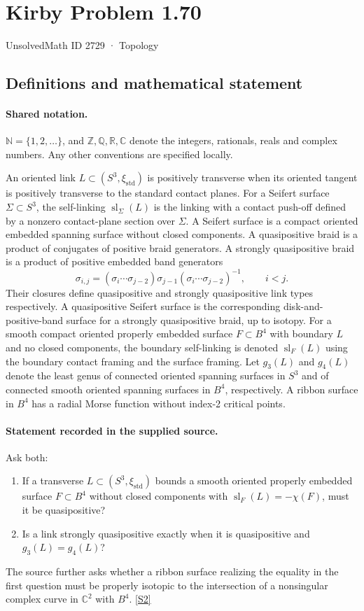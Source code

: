 \documentclass[11pt]{article}
\newcommand{\sref}[2]{\hyperlink{source:#1:#2}{[S#2]}}
\begin{document}
\setcounter{section}{2728}
\section{Kirby Problem 1.70}\label{2729}
{\small\sffamily UnsolvedMath ID 2729 · Topology}
\subsection{Definitions and mathematical statement}

\paragraph{Shared notation.}$\mathbb N=\{1,2,\ldots\}$, and $\mathbb Z,\mathbb Q,\mathbb R,\mathbb C$ denote the integers, rationals, reals and complex numbers. Any other conventions are specified locally.


An oriented link $L\subset(S^3,\xi_{\mathrm{std}})$ is positively transverse when its oriented tangent is positively transverse to the standard contact planes. For a Seifert surface $\Sigma\subset S^3$, the self-linking $\operatorname{sl}_\Sigma(L)$ is the linking with a contact push-off defined by a nonzero contact-plane section over $\Sigma$. A Seifert surface is a compact oriented embedded spanning surface without closed components. A quasipositive braid is a product of conjugates of positive braid generators. A strongly quasipositive braid is a product of positive embedded band generators
\[\sigma_{i,j}=(\sigma_i\cdots\sigma_{j-2})\sigma_{j-1}(\sigma_i\cdots\sigma_{j-2})^{-1},\qquad i<j.\]
Their closures define quasipositive and strongly quasipositive link types respectively. A quasipositive Seifert surface is the corresponding disk-and-positive-band surface for a strongly quasipositive braid, up to isotopy. For a smooth compact oriented properly embedded surface $F\subset B^4$ with boundary $L$ and no closed components, the boundary self-linking is denoted $\operatorname{sl}_F(L)$ using the boundary contact framing and the surface framing. Let $g_3(L)$ and $g_4(L)$ denote the least genus of connected oriented spanning surfaces in $S^3$ and of connected smooth oriented spanning surfaces in $B^4$, respectively. A ribbon surface in $B^4$ has a radial Morse function without index-2 critical points.
\paragraph{Statement recorded in the supplied source.}
Ask both:
\begin{enumerate}
\item If a transverse $L\subset(S^3,\xi_{\mathrm{std}})$ bounds a smooth oriented properly embedded surface $F\subset B^4$ without closed components with $\operatorname{sl}_F(L)=-\chi(F)$, must it be quasipositive?
\item Is a link strongly quasipositive exactly when it is quasipositive and $g_3(L)=g_4(L)$?
\end{enumerate}
The source further asks whether a ribbon surface realizing the equality in the first question must be properly isotopic to the intersection of a nonsingular complex curve in $\mathbb C^2$ with $B^4$. \sref{2729}{2}
\end{document}
